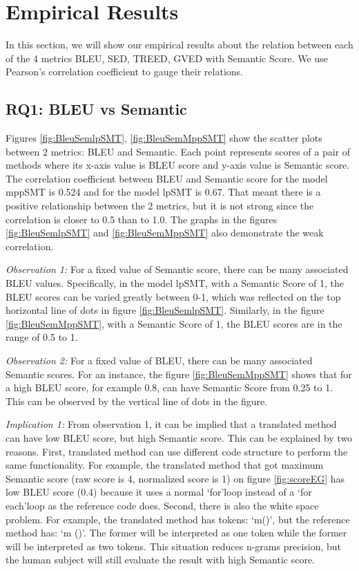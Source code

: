 \section{Empirical Results}
In this section, we will show our empirical results about the relation between each of the 4 metrics BLEU, SED, TREED, GVED with Semantic Score. We use Pearson\rq s correlation coefficient to gauge their relations. 
\subsection{RQ1: BLEU vs Semantic}
Figures \ref{fig:BleuSemlpSMT}, \ref{fig:BleuSemMppSMT}  show the scatter plots between 2 metrics: BLEU and Semantic. Each point represents scores of a pair of methods where its x-axis value is BLEU score and y-axis value is Semantic score.
The correlation coefficient between BLEU and Semantic score for the model mppSMT is 0.524 and for the model lpSMT is 0.67. That meant there is a positive relationship between the 2 metrics, but it is not strong since the correlation is closer to 0.5 than to 1.0. The graphs in the figures \ref{fig:BleuSemlpSMT} and \ref{fig:BleuSemMppSMT}  also demonstrate the weak correlation.

\emph{Observation 1:} For a fixed value of Semantic score, there can be many associated BLEU values. Specifically, in the model lpSMT, with a Semantic Score of 1, the BLEU scores can be varied greatly between 0-1, which was reflected on the top horizontal line of dots in figure \ref{fig:BleuSemlpSMT}. Similarly, in the figure \ref{fig:BleuSemMppSMT}, with a Semantic Score of 1, the BLEU scores are in the range of 0.5 to 1. 

\emph{Observation 2:} For a fixed value of BLEU, there can be many associated Semantic scores. For an instance, the figure \ref{fig:BleuSemMppSMT} shows that for a high BLEU score, for example 0.8, can have Semantic Score from 0.25 to 1. This can be observed by the vertical line of dots in the figure. 

\emph{Implication 1: }From observation 1, it can be implied that a translated method can have low BLEU score, but high Semantic score. This can be explained by two reasons. First, translated method can use different code structure to perform the same functionality. For example, the translated method that got maximum Semantic score (raw score is 4, normalized score is 1) on figure \ref{fig:scoreEG} has low BLEU score (0.4) because it uses a normal \lq for\rq  loop instead of a \lq for each\rq  loop as the reference code does. Second, there is also the white space problem. For example, the translated method has tokens: \lq m()\rq, but the reference method has: \lq m ()\rq. The former will be interpreted as one token while the former will be interpreted as two tokens. This situation reduces n-grams precision, but the human subject will still evaluate the result with high Semantic score.     

